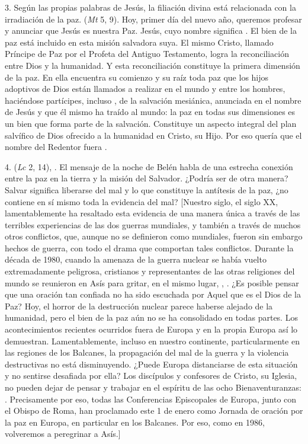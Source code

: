 \begin{body}
	3. Según las propias palabras de Jesús, la filiación divina está relacionada con la irradiación de la paz.  (\emph{Mt} 5, 9). Hoy, primer día del nuevo año, queremos profesar y anunciar que Jesús es nuestra Paz. Jesús, cuyo nombre significa . El bien de la paz está incluido en esta misión salvadora suya. El mismo Cristo, llamado Príncipe de Paz por el Profeta del Antiguo Testamento, logra la reconciliación entre Dios y la humanidad. Y esta reconciliación constituye la primera dimensión de la paz. En ella encuentra su comienzo y su raíz toda paz que los hijos adoptivos de Dios están llamados a realizar en el mundo y entre los hombres, haciéndose partícipes, incluso , de la salvación mesiánica, anunciada en el nombre de Jesús y que él mismo ha traído al mundo: la paz en todas sus dimensiones es un bien que forma parte de la salvación. Constituye un aspecto integral del plan salvífico de Dios ofrecido a la humanidad en Cristo, su Hijo. Por eso quería que el nombre del Redentor fuera .

	4.  (\emph{Lc} 2, 14), . El mensaje de la noche de Belén habla de una estrecha conexión entre la paz en la tierra y la misión del Salvador. ¿Podría ser de otra manera? Salvar significa liberarse del mal y lo que constituye la antítesis de la paz, ¿no contiene en sí mismo toda la evidencia del mal? {[}Nuestro siglo, el siglo XX, lamentablemente ha resaltado esta evidencia de una manera única a través de las terribles experiencias de las dos guerras mundiales, y también a través de muchos otros conflictos, que, aunque no se definieron como mundiales, fueron sin embargo hechos de guerra, con todo el drama que comportan tales conflictos. Durante la década de 1980, cuando la amenaza de la guerra nuclear se había vuelto extremadamente peligrosa, cristianos y representantes de las otras religiones del mundo se reunieron en Asís para gritar, en el mismo lugar, , . ¿Es posible pensar que una oración tan confiada no ha sido escuchada por Aquel que es el Dios de la Paz? Hoy, el horror de la destrucción nuclear parece haberse alejado de la humanidad, pero el bien de la paz aún no se ha consolidado en todas partes. Los acontecimientos recientes ocurridos fuera de Europa y en la propia Europa así lo demuestran. Lamentablemente, incluso en nuestro continente, particularmente en las regiones de los Balcanes, la propagación del mal de la guerra y la violencia destructivas no está disminuyendo. ¿Puede Europa distanciarse de esta situación y no sentirse desafiada por ella? Los discípulos y confesores de Cristo, su Iglesia, no pueden dejar de pensar y trabajar en el espíritu de las ocho Bienaventuranzas: . Precisamente por eso, todas las Conferencias Episcopales de Europa, junto con el Obispo de Roma, han proclamado este 1 de enero como Jornada de oración por la paz en Europa, en particular en los Balcanes. Por eso, como en 1986, volveremos a peregrinar a Asís.{]}


\end{body}

